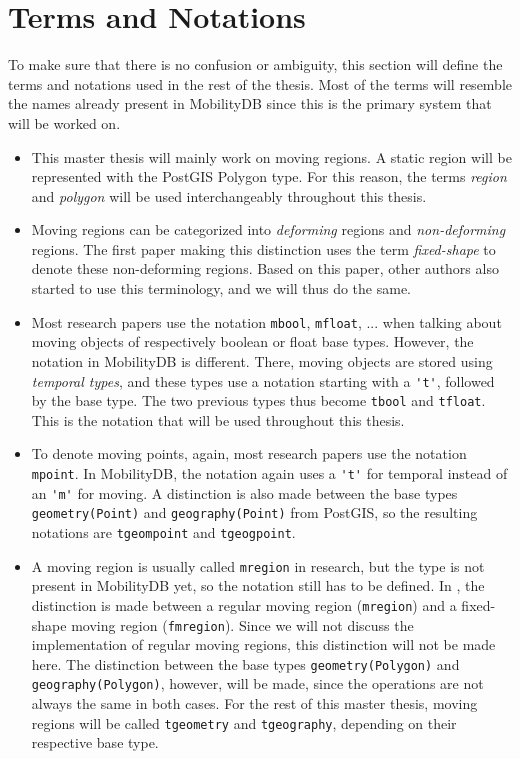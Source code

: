 \section{Terms and Notations}

To make sure that there is no confusion or ambiguity, this section will define the terms and notations used in the rest of the thesis. Most of the terms will resemble the names already present in MobilityDB since this is the primary system that will be worked on.

\begin{itemize}
    \item This master thesis will mainly work on moving regions. A static region will be represented with the PostGIS Polygon type. For this reason, the terms \textit{region} and \textit{polygon} will be used interchangeably throughout this thesis.

    \item Moving regions can be categorized into \textit{deforming} regions and \textit{non-deforming} regions. The first paper \cite{fmregion} making this distinction uses the term \textit{fixed-shape} to denote these non-deforming regions. Based on this paper, other authors \cite{modeling_and_representing, polyhedra} also started to use this terminology, and we will thus do the same.

    \item Most research papers use the notation \lstinline{mbool}, \lstinline{mfloat}, ... when talking about moving objects of respectively boolean or float base types. However, the notation in MobilityDB is different. There, moving objects are stored using \textit{temporal types}, and these types use a notation starting with a \lstinline{'t'}, followed by the base type. The two previous types thus become \lstinline{tbool} and \lstinline{tfloat}. This is the notation that will be used throughout this thesis.

    \item To denote moving points, again, most research papers use the notation \lstinline{mpoint}. In MobilityDB, the notation again uses a \lstinline{'t'} for temporal instead of an \lstinline{'m'} for moving. A distinction is also made between the base types \lstinline{geometry(Point)} and \lstinline{geography(Point)} from PostGIS, so the resulting notations are \lstinline{tgeompoint} and \lstinline{tgeogpoint}.

    \item A moving region is usually called \lstinline{mregion} in research, but the type is not present in MobilityDB yet, so the notation still has to be defined. In \cite{fmregion}, the distinction is made between a regular moving region (\lstinline{mregion}) and a fixed-shape moving region (\lstinline{fmregion}). Since we will not discuss the implementation of regular moving regions, this distinction will not be made here. The distinction between the base types \lstinline{geometry(Polygon)} and \lstinline{geography(Polygon)}, however, will be made, since the operations are not always the same in both cases. For the rest of this master thesis, moving regions will be called \lstinline{tgeometry} and \lstinline{tgeography}, depending on their respective base type.


\end{itemize}

